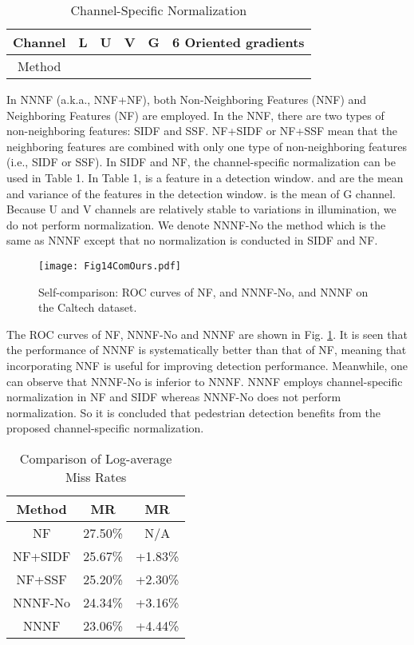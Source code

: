 \documentclass[10pt,twocolumn,letterpaper]{article}
\begin{document}
\begin{table}
\begin{center}
\centering
\begin{tabular}{|c|c|c|c|c|c|}
\hline
Channel & L & U & V & G & 6 Oriented gradients \\
\hline
Method &  & \multicolumn{2}{c|}{}   & \multicolumn{2}{c|}{}\\
\hline
\end{tabular}
\end{center}
\caption{Channel-Specific Normalization}
\end{table}

In NNNF (a.k.a., NNF+NF), both Non-Neighboring Features (NNF) and 
Neighboring Features (NF) are employed. In the NNF, there are two types of 
non-neighboring features: SIDF and SSF. NF+SIDF or NF+SSF mean that 
the neighboring features are combined with only one type of non-neighboring features (i.e., 
SIDF or SSF). In SIDF and NF, the channel-specific 
normalization can be used in Table 1. In Table 1,  is a feature in a detection window.  and  are the mean and variance of the features in the detection window.  is the mean of G channel. Because U and V channels are relatively stable to variations in illumination, we do not perform normalization. We denote NNNF-No the 
method which is the same as NNNF except that no normalization is conducted 
in SIDF and NF. 



\begin{figure}[!t]
\centering
\texttt{[image: Fig14ComOurs.pdf]}
\caption{ Self-comparison: ROC curves of NF, and NNNF-No, and NNNF on the Caltech dataset.}
\label{FigComOurs}
\end{figure}


The ROC curves of NF, NNNF-No and NNNF are shown in Fig. \ref{FigComOurs}. It is seen that 
the performance of NNNF is systematically better than that of NF, meaning 
that incorporating NNF is useful for improving detection performance. 
Meanwhile, one can observe that NNNF-No is inferior to NNNF. NNNF employs 
channel-specific normalization in NF and SIDF whereas 
NNNF-No does not perform normalization. So it is concluded that pedestrian 
detection benefits from the proposed channel-specific normalization. 

\begin{table}
\begin{center}
\begin{tabular}{c c c }
\hline
Method & MR        & MR \\
\hline
NF     & 27.50\%   & N/A \\
NF+SIDF & 25.67\%  & +1.83\% \\
NF+SSF & 25.20\%   & +2.30\% \\
NNNF-No & 24.34\%   & +3.16\% \\
NNNF   & 23.06\%      & +4.44\%\\
\hline
\end{tabular}
\end{center}
\caption{Comparison of Log-average Miss Rates}
\end{table}
\end{document}
